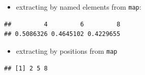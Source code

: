 \documentclass[]{book}
\newenvironment{Shaded}{\begin{snugshade}}{\end{snugshade}}
\newcommand{\DecValTok}[1]{\textcolor[rgb]{0.00,0.00,0.81}{#1}}
\newcommand{\KeywordTok}[1]{\textcolor[rgb]{0.13,0.29,0.53}{\textbf{#1}}}
\newcommand{\NormalTok}[1]{#1}
\newcommand{\OperatorTok}[1]{\textcolor[rgb]{0.81,0.36,0.00}{\textbf{#1}}}
\newcommand{\StringTok}[1]{\textcolor[rgb]{0.31,0.60,0.02}{#1}}
\providecommand{\tightlist}{%
  \setlength{\itemsep}{0pt}\setlength{\parskip}{0pt}}
\theoremstyle{definition}
\theoremstyle{definition}
\theoremstyle{definition}
\theoremstyle{remark}
\begin{document}
\begin{itemize}
\tightlist
\item
  extracting by named elements from \texttt{map}:
\end{itemize}

\begin{Shaded}
\end{Shaded}

\begin{verbatim}
##         4         6         8 
## 0.5086326 0.4645102 0.4229655
\end{verbatim}

\begin{itemize}
\tightlist
\item
  extracting by positions from \texttt{map}
\end{itemize}

\begin{Shaded}
\end{Shaded}

\begin{verbatim}
## [1] 2 5 8
\end{verbatim}
\end{document}
